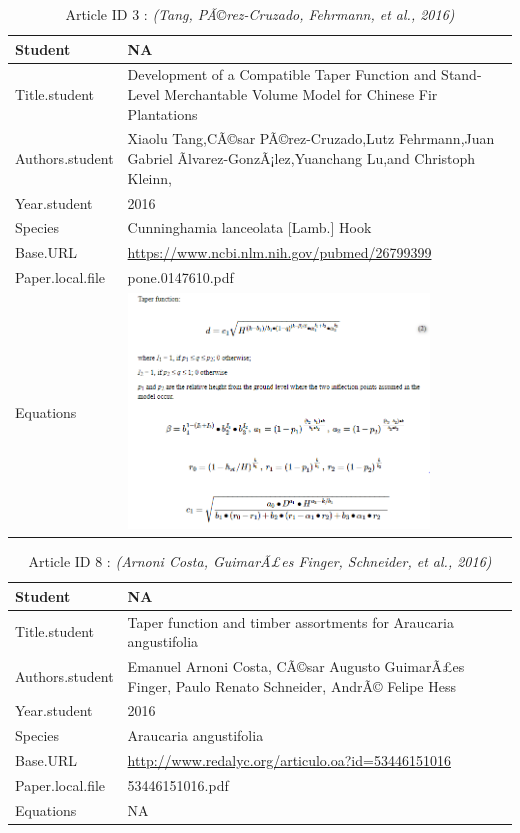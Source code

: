 \documentclass[]{article}
\begin{document}
\begin{table}
\caption{
Article ID 3 : \textit{(Tang, PÃ©rez-Cruzado, Fehrmann, et al., 2016)}\\
}
\begin{tabular}{p{} p{}}
\hline
Student & NA \\ \hline
Title.student & Development of a Compatible Taper Function and Stand-Level Merchantable Volume Model for Chinese Fir Plantations \\ \hline
Authors.student & Xiaolu Tang,CÃ©sar PÃ©rez-Cruzado,Lutz Fehrmann,Juan Gabriel Ãlvarez-GonzÃ¡lez,Yuanchang Lu,and Christoph Kleinn, \\ \hline
Year.student & 2016 \\ \hline
Species & Cunninghamia lanceolata [Lamb.] Hook \\ \hline
Base.URL & \url{https://www.ncbi.nlm.nih.gov/pubmed/26799399} \\ \hline
Paper.local.file & pone.0147610.pdf \\ \hline
Equations & \includegraphics[width=0.8\textwidth]{Equations/2016TangEtAl.png} \\ \hline
\end{tabular}\end{table}

\begin{table}
\caption{
Article ID 8 : \textit{(Arnoni Costa, GuimarÃ£es Finger, Schneider, et al., 2016)}\\
}
\begin{tabular}{p{} p{}}
\hline
Student & NA \\ \hline
Title.student & Taper function and timber assortments for Araucaria angustifolia \\ \hline
Authors.student & Emanuel Arnoni Costa, CÃ©sar Augusto GuimarÃ£es Finger, Paulo Renato Schneider, AndrÃ© Felipe Hess \\ \hline
Year.student & 2016 \\ \hline
Species & Araucaria angustifolia \\ \hline
Base.URL & \url{http://www.redalyc.org/articulo.oa?id=53446151016} \\ \hline
Paper.local.file & 53446151016.pdf \\ \hline
Equations & NA \\ \hline
\end{tabular}\end{table}
\end{document}
